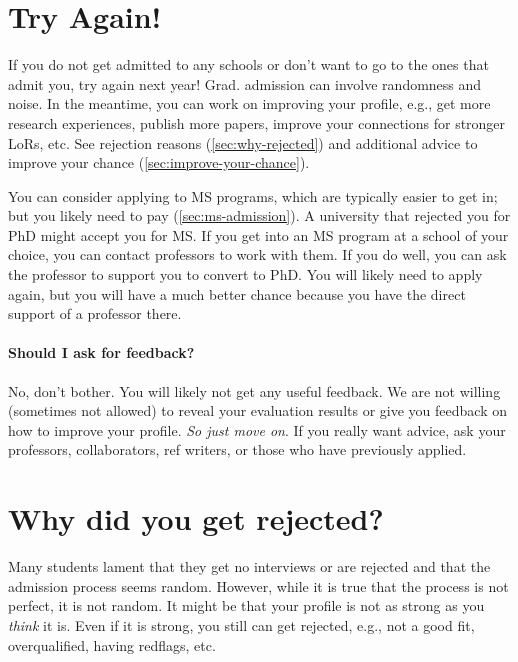 \documentclass[oneside,11pt,dvipsnames]{book}
\newcommand{\subsectioninfo}[1]{%
  \phantomsection
  \addcontentsline{toc}{subsectioninfo}{\textcolor{black}{\texttt #1}}%
}
\begin{document}
\section{Try Again!}\label{sec:try-again}

If you do not get admitted to any schools or don't want to go to the ones that admit you, try again next year!  Grad. admission can involve randomness and noise. In the meantime, you can work on improving your profile, e.g., get more research experiences, publish more papers, improve your connections for stronger LoRs, etc. See rejection reasons (\autoref{sec:why-rejected}) and additional advice to improve your chance (\autoref{sec:improve-your-chance}).

You can consider applying to MS programs, which are typically easier to get in; but you likely need to pay (\autoref{sec:ms-admission}).  A university that rejected you for PhD might accept you for MS.
If you get into an MS program at a school of your choice, you can contact professors to work with them. If you do well, you can ask the professor to support you to convert to PhD. You will likely need to apply again, but you will have a much better chance because you have the direct support of a professor there.

\paragraph{Should I ask for feedback?}
No, don't bother.  You will likely not get any useful feedback.  We are not willing (sometimes not allowed) to reveal your evaluation results or give you feedback on how to improve your profile. \emph{So just move on}.  If you really want advice, ask your professors, collaborators, ref writers, or those who have previously applied.


\section{Why did you get rejected?}\label{sec:why-rejected}
\subsectioninfo{You aim too high, are overqualified, or even because you applied to AI/ML, a super competitive field in recent years with many applicants.}

Many students lament that they get no interviews or are rejected and that the admission process seems random.  However, while it is true that the process is not perfect, it is not random.
It might be that your profile is not as strong as you \emph{think} it is.  Even if it is strong, you still can get rejected, e.g., not a good fit, overqualified, having redflags, etc. 
\end{document}
